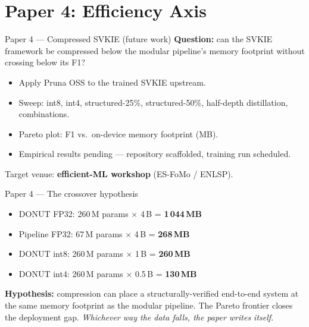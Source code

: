 \documentclass{beamer}
\begin{document}
\section{Paper 4: Efficiency Axis}
\begin{frame}{Paper 4 --- Compressed SVKIE (future work)}
  \textbf{Question:} can the SVKIE framework be compressed below the
  modular pipeline's memory footprint without crossing below its F1?
  \vspace{0.5em}
  \begin{itemize}
    \item Apply Pruna OSS to the trained SVKIE upstream.
    \item Sweep: int8, int4, structured-25\%, structured-50\%,
          half-depth distillation, combinations.
    \item Pareto plot: F1 vs.\ on-device memory footprint (MB).
    \item Empirical results pending --- repository scaffolded,
          training run scheduled.
  \end{itemize}
  Target venue: \textbf{efficient-ML workshop} (ES-FoMo / ENLSP).
\end{frame}

\begin{frame}{Paper 4 --- The crossover hypothesis}
  \begin{itemize}
    \item DONUT FP32: 260\,M params $\times$ 4\,B = \textbf{1\,044\,MB}
    \item Pipeline FP32: 67\,M params $\times$ 4\,B = \textbf{268\,MB}
    \item DONUT int8: 260\,M params $\times$ 1\,B = \textbf{260\,MB}
    \item DONUT int4: 260\,M params $\times$ 0.5\,B = \textbf{130\,MB}
  \end{itemize}
  \vspace{0.5em}
  \textbf{Hypothesis:} compression can place a structurally-verified
  end-to-end system at the same memory footprint as the modular
  pipeline.  The Pareto frontier closes the deployment gap.
  \vspace{0.5em}
  \emph{Whichever way the data falls, the paper writes itself.}
\end{frame}

\end{document}

